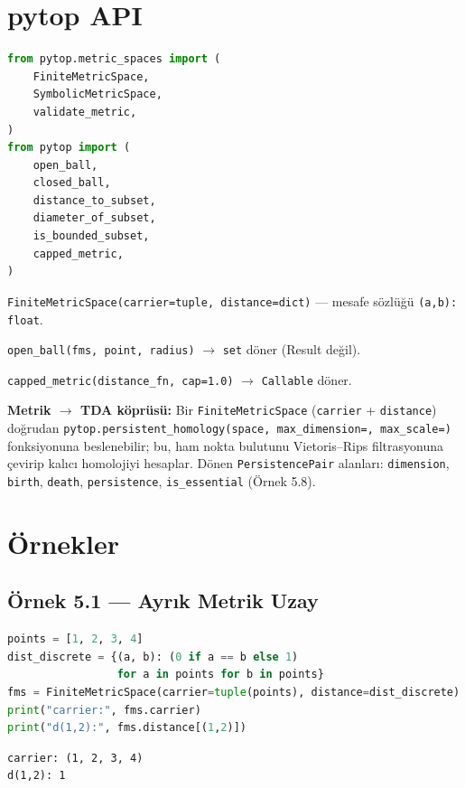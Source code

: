 \section{pytop API}

\begin{lstlisting}[language=Python]
from pytop.metric_spaces import (
    FiniteMetricSpace,
    SymbolicMetricSpace,
    validate_metric,
)
from pytop import (
    open_ball,
    closed_ball,
    distance_to_subset,
    diameter_of_subset,
    is_bounded_subset,
    capped_metric,
)
\end{lstlisting}

\texttt{FiniteMetricSpace(carrier=tuple, distance=dict)} — mesafe sözlüğü \texttt{(a,b): float}.

\texttt{open\_ball(fms, point, radius)} $\to$ \texttt{set} döner (Result değil).

\texttt{capped\_metric(distance\_fn, cap=1.0)} $\to$ \texttt{Callable} döner.

\textbf{Metrik $\to$ TDA köprüsü:} Bir \texttt{FiniteMetricSpace}
(\texttt{carrier} + \texttt{distance}) doğrudan
\texttt{pytop.persistent\_homology(space, max\_dimension=, max\_scale=)} fonksiyonuna
beslenebilir; bu, ham nokta bulutunu Vietoris–Rips filtrasyonuna çevirip kalıcı
homolojiyi hesaplar. Dönen \texttt{PersistencePair} alanları: \texttt{dimension},
\texttt{birth}, \texttt{death}, \texttt{persistence}, \texttt{is\_essential}
(Örnek 5.8).

\section{Örnekler}

\subsection*{Örnek 5.1 — Ayrık Metrik Uzay}

\begin{lstlisting}[language=Python]
points = [1, 2, 3, 4]
dist_discrete = {(a, b): (0 if a == b else 1)
                 for a in points for b in points}
fms = FiniteMetricSpace(carrier=tuple(points), distance=dist_discrete)
print("carrier:", fms.carrier)
print("d(1,2):", fms.distance[(1,2)])
\end{lstlisting}

\begin{verbatim}
carrier: (1, 2, 3, 4)
d(1,2): 1
\end{verbatim}

